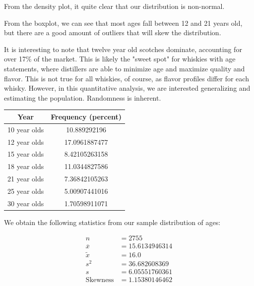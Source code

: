 From the density plot, it quite clear that our distribution is non-normal. 

\pagebreak

From the boxplot, we can see that most ages fall between 12 and 21 years old, but there are a good amount of outliers that will skew the distribution.

It is interesting to note that twelve year old scotches dominate, accounting for over 17\% of the market. This is likely the "sweet spot" for whiskies with age statements, where distillers are able to minimize age and maximize quality and flavor. This is not true for all whiskies, of course, as flavor profiles differ for each whisky. However, in this quantitative analysis, we are interested generalizing and estimating the population. Randomness is inherent. 


\begin{center}
\begin{tabular}{ c c }
 Year & Frequency (percent)\\
 \hline
 \hline
    10 year olds & 10.889292196\\
    12 year olds & 17.0961887477\\
    15 year olds & 8.42105263158\\
    18 year olds & 11.0344827586\\
    21 year olds & 7.36842105263\\
    25 year olds & 5.00907441016\\
    30 year olds & 1.70598911071\\
\end{tabular}
\end{center}
\label{fig:most_common_ages}

We obtain the following statistics from our sample distribution of ages:

\begin{equation*}
\begin{split}
    n &= 2755 \\
    \overline{x} &=  15.6134946314 \\
    \widetilde{x} &= 16.0 \\
    s^2 &= 36.682608369 \\
    s &= 6.05551760361 \\
    \text{Skewness} &= 1.15380146462 \\
\end{split}
\end{equation*}

\pagebreak

